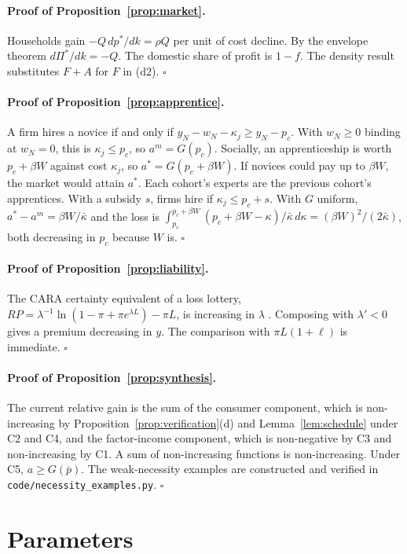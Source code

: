\documentclass[12pt]{article}
\theoremstyle{remark}
\begin{document}
\paragraph{Proof of Proposition~\ref{prop:market}.} Households gain $-Q\,dp^*/dk=\rho Q$ per unit of cost decline. By the envelope theorem $d\Pi^*/dk=-Q$. The domestic share of profit is $1-f$. The density result substitutes $F+A$ for $F$ in (d2). $\square$

\paragraph{Proof of Proposition~\ref{prop:apprentice}.} A firm hires a novice if and only if $y_N-w_N-\kappa_j\ge y_N-p_c$. With $w_N\ge0$ binding at $w_N=0$, this is $\kappa_j\le p_c$, so $a^m=G(p_c)$. Socially, an apprenticeship is worth $p_c+\beta W$ against cost $\kappa_j$, so $a^*=G(p_c+\beta W)$. If novices could pay up to $\beta W$, the market would attain $a^*$. Each cohort's experts are the previous cohort's apprentices. With a subsidy $s$, firms hire if $\kappa_j\le p_c+s$. With $G$ uniform, $a^*-a^m=\beta W/\bar\kappa$ and the loss is $\int_{p_c}^{p_c+\beta W}(p_c+\beta W-\kappa)/\bar\kappa\,d\kappa=(\beta W)^2/(2\bar\kappa)$, both decreasing in $p_c$ because $W$ is. $\square$

\paragraph{Proof of Proposition~\ref{prop:liability}.} The CARA certainty equivalent of a loss lottery, $RP=\lambda^{-1}\ln(1-\pi+\pi e^{\lambda L})-\pi L$, is increasing in $\lambda$ \citep{pratt1964risk}. Composing with $\lambda'<0$ gives a premium decreasing in $y$. The comparison with $\pi L(1+\ell)$ is immediate. $\square$

\paragraph{Proof of Proposition~\ref{prop:synthesis}.} The current relative gain is the sum of the consumer component, which is non-increasing by Proposition~\ref{prop:verification}(d) and Lemma~\ref{lem:schedule} under C2 and C4, and the factor-income component, which is non-negative by C3 and non-increasing by C1. A sum of non-increasing functions is non-increasing. Under C5, $a\ge G(\bar p)$. The weak-necessity examples are constructed and verified in \texttt{code/necessity\_examples.py}. $\square$

\section{Parameters}\label{app:params}

\end{document}
